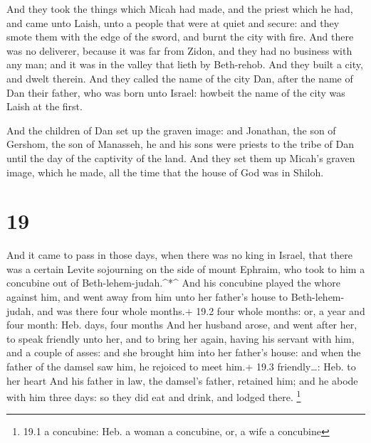  And they took the things which Micah had made, and the
priest which he had, and came unto Laish, unto a people that were at
quiet and secure: and they smote them with the edge of the sword, and
burnt the city with fire.  And there was no deliverer,
because it was far from Zidon, and they had no business with any man;
and it was in the valley that lieth by Beth-rehob. And they built a
city, and dwelt therein.  And they called the name of the
city Dan, after the name of Dan their father, who was born unto Israel:
howbeit the name of the city was Laish at the first.

 And the children of Dan set up the graven image: and
Jonathan, the son of Gershom, the son of Manasseh, he and his sons were
priests to the tribe of Dan until the day of the captivity of the land.
 And they set them up Micah's graven image, which he made,
all the time that the house of God was in Shiloh.

\hypertarget{section-18}{%
\section{19}\label{section-18}}

 And it came to pass in those days, when there was no king
in Israel, that there was a certain Levite sojourning on the side of
mount Ephraim, who took to him a concubine out of
Beth-lehem-judah.\^{}*\^{}  And his concubine played the
whore against him, and went away from him unto her father's house to
Beth-lehem-judah, and was there four whole months.+ 19.2 four whole
months: or, a year and four month: Heb. days, four months 
And her husband arose, and went after her, to speak friendly unto her,
and to bring her again, having his servant with him, and a couple of
asses: and she brought him into her father's house: and when the father
of the damsel saw him, he rejoiced to meet him.+ 19.3 friendly\ldots:
Heb. to her heart  And his father in law, the damsel's
father, retained him; and he abode with him three days: so they did eat
and drink, and lodged there. \footnote{19.1 a concubine: Heb. a woman a
  concubine, or, a wife a concubine}

